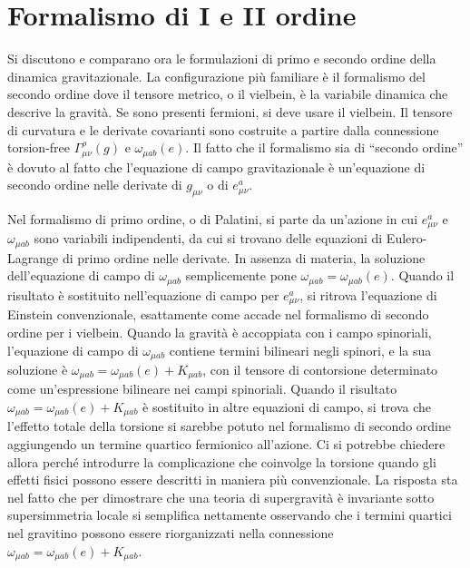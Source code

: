 \chapter{Formalismo di I e II ordine}
Si discutono e comparano ora le formulazioni di primo e secondo ordine della dinamica gravitazionale. La configurazione più familiare è il formalismo del secondo ordine dove il tensore metrico, o il vielbein, è la variabile dinamica che descrive la gravità. Se sono presenti fermioni, si deve usare il vielbein. Il tensore di curvatura e le derivate covarianti sono costruite a partire dalla connessione torsion-free $\Gamma^\rho_{\mu\nu}(g)$ e $\omega_{\mu ab}(e)$. Il fatto che il formalismo sia di ``secondo ordine'' è dovuto al fatto che l'equazione di campo gravitazionale è un'equazione di secondo ordine nelle derivate di $g_{\mu\nu}$ o di $e^a_{\mu\nu}$. 

Nel formalismo di primo ordine, o di Palatini, si parte da un'azione in cui $e^a_{\mu\nu}$ e $\omega_{\mu ab}$ sono variabili indipendenti, da cui si trovano delle equazioni di Eulero-Lagrange di primo ordine nelle derivate. In assenza di materia, la soluzione dell'equazione di campo di $\omega_{\mu ab}$ semplicemente pone $\omega_{\mu ab} = \omega_{\mu ab}(e)$. Quando il risultato è sostituito nell'equazione di campo per $e^a_{\mu\nu}$, si ritrova l'equazione di Einstein convenzionale, esattamente come accade nel formalismo di secondo ordine per i vielbein. Quando la gravità è accoppiata con i campo spinoriali, l'equazione di campo di $\omega_{\mu ab}$ contiene termini bilineari negli spinori, e la sua soluzione è $\omega_{\mu ab} = \omega_{\mu ab}(e) + K_{\mu ab}$, con il tensore di contorsione determinato come un'espressione bilineare nei campi spinoriali. Quando il risultato $\omega_{\mu ab} = \omega_{\mu ab}(e) + K_{\mu ab}$ è sostituito in altre equazioni di campo, si trova che l'effetto totale della torsione si sarebbe potuto nel formalismo di secondo ordine aggiungendo un termine quartico fermionico all'azione. Ci si potrebbe chiedere allora perché introdurre la complicazione che coinvolge la torsione quando gli effetti fisici possono essere descritti in maniera più convenzionale. La risposta sta nel fatto che per dimostrare che una teoria di supergravità è invariante sotto supersimmetria locale si semplifica nettamente osservando che i termini quartici nel gravitino possono essere riorganizzati nella connessione $\omega_{\mu ab} = \omega_{\mu ab}(e) + K_{\mu ab}$.

